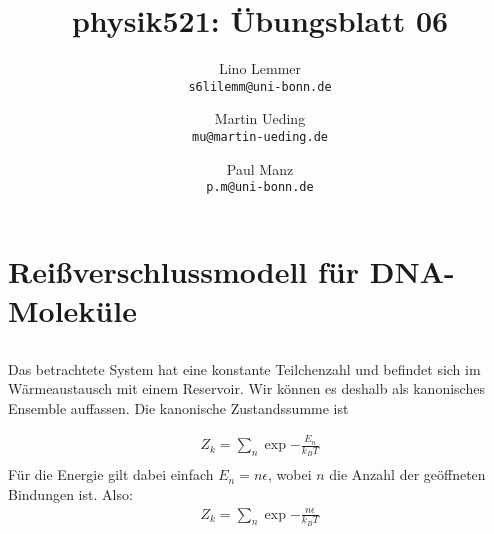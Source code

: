 

\setcounter{section}{0}
\renewcommand\thesection{H\,6.\arabic{section}}
\renewcommand\thesubsection{\thesection.\alph{subsection}}

\title{physik521: Übungsblatt 06}
\author{%
    Lino Lemmer \\ \small{\texttt{s6lilemm@uni-bonn.de}}
    \and
    Martin Ueding \\ \small{\texttt{mu@martin-ueding.de}}
    \and
    Paul Manz \\ \small{\texttt{p.m@uni-bonn.de}}
}


\maketitle

\section{Reißverschlussmodell für DNA-Moleküle}
\subsection{}
Das betrachtete System hat eine konstante Teilchenzahl und befindet sich im Wärmeaustausch mit einem Reservoir. Wir können es deshalb als kanonisches Ensemble auffassen. Die kanonische Zustandssumme ist

\begin{align*}
Z_k = \sum_n \exp{-\frac{E_n}{k_B T}} \\
\end{align*}
Für die Energie gilt dabei einfach $E_n=n\epsilon$, wobei $n$ die Anzahl der geöffneten Bindungen ist. Also:
\begin{align*}
Z_k = \sum_n \exp{-\frac{n\epsilon}{k_B T}} \\
\end{align*}

